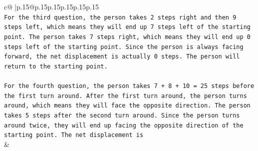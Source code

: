 \documentclass{article}
\begin{document}
{\begin{supertabular}{c@{$\;$}|p{.15\linewidth}@{}p{.15\linewidth}p{.15\linewidth}p{.15\linewidth}p{.15\linewidth}p{.15\linewidth}}
{{{\\ 
\texttt{For the third question, the person takes 2 steps right and then 9 steps left, which means they will end up 7 steps left of the starting point. The person takes 7 steps right, which means they will end up 0 steps left of the starting point. Since the person is always facing forward, the net displacement is actually 0 steps. The person will return to the starting point.} \\
\\ 
\texttt{For the fourth question, the person takes 7 + 8 + 10 = 25 steps before the first turn around. After the first turn around, the person turns around, which means they will face the opposite direction. The person takes 5 steps after the second turn around. Since the person turns around twice, they will end up facing the opposite direction of the starting point. The net displacement is} \\
            }
        }
    }
    & \\ \\

\end{supertabular}
}
\end{document}
